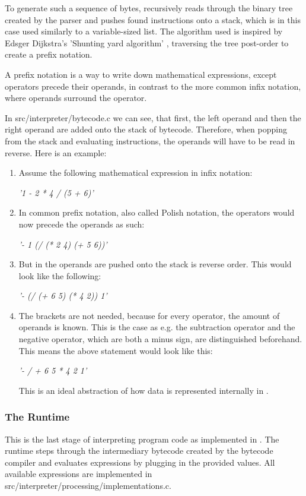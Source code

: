 \documentclass[12pt,a4paper]{article}
\newcommand{\cte}[1] {
    \cite{#1}
}
\newcommand{\expr}[1] {
    \begin{center}
        #1
    \end{center}
}
\begin{document}
To generate such a sequence of bytes, \name recursively reads through the
binary tree created by the parser and pushes found instructions onto a stack,
which is in this case used similarly to a variable-sized list.
The algorithm used is inspired by Edsger Dijkstra's 'Shunting yard 
algorithm'\cte{shunting_yard}, traversing the tree post-order to create
a prefix notation. 

A prefix notation is a way to write down mathematical expressions, except
operators precede their operands, in contrast to the more common infix notation,
where operands surround the operator.

In src/interpreter/bytecode.c we can see, that first, the left operand and then
the right operand are added onto the stack of bytecode. Therefore, when
popping from the stack and evaluating instructions, the operands will have to
be read in reverse.
Here is an example:
\begin{enumerate}
    \item Assume the following mathematical expression in infix notation:
        \expr{\emph{'1 - 2 * 4 / (5 + 6)'}}
    \item In common prefix notation, also called Polish notation, the
        operators would now precede the operands as such:
        \expr{\emph{'- 1 (/ (* 2 4) (+ 5 6))'}}
    \item But in \name the operands are pushed onto the stack is reverse order.
        This would look like the following:
        \expr{\emph{'- (/ (+ 6 5) (* 4 2)) 1'}}
    \item The brackets are not needed, because for every operator, the amount
        of operands is known. This is the case as e.g. the subtraction operator
        and the negative operator, which are both a minus sign, are distinguished
        beforehand. This means the above statement would look like this:
        \expr{\emph{'- / + 6 5 * 4 2 1'}}
        This is an ideal abstraction of how data 
        is represented internally in \name.
\end{enumerate}

\subsubsection{The Runtime}
This is the last stage of interpreting program code as implemented in \name.
The runtime steps through the intermediary bytecode created by the bytecode
compiler and evaluates expressions by plugging in the provided values.
All available expressions are implemented in 
src/interpreter/processing/implementations.c.
\end{document}
